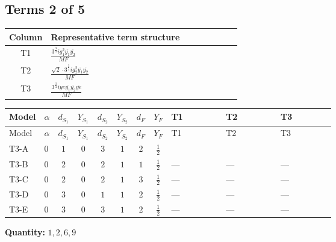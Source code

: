 \documentclass[8pt]{article}
\begin{document}
\begin{landscape}
\subsection*{Terms 2 of 5}
\begin{center}
\begin{tabular}{@{}c >{\raggedright\arraybackslash}p{0.82\linewidth}@{}}
\toprule
Column & Representative term structure \\
\midrule
T1 & \(\displaystyle \frac{3^{\frac{3}{4}} i g_{1}^{2} \overline{y_{1}} \overline{y_{2}}}{MF}\) \\
\midrule
T2 & \(\displaystyle \frac{\sqrt{2} \cdot 3^{\frac{3}{4}} i g_{2}^{2} \overline{y_{1}} \overline{y_{2}}}{MF}\) \\
\midrule
T3 & \(\displaystyle \frac{3^{\frac{3}{4}} i ye \overline{y_{1}} \overline{y_{2}} \overline{ye}}{MF}\) \\
\midrule
\bottomrule
\end{tabular}
\end{center}
\smallskip
\tiny
\begin{longtable}{@{}llcccccc >{\raggedright\arraybackslash}p{0.21\linewidth} >{\raggedright\arraybackslash}p{0.21\linewidth} >{\raggedright\arraybackslash}p{0.21\linewidth}@{}}
\toprule
Model & $\alpha$ & $d_{S_1}$ & $Y_{S_1}$ & $d_{S_2}$ & $Y_{S_2}$ & $d_F$ & $Y_F$ & T1 & T2 & T3 \\
\midrule
\endfirsthead
\toprule
Model & $\alpha$ & $d_{S_1}$ & $Y_{S_1}$ & $d_{S_2}$ & $Y_{S_2}$ & $d_F$ & $Y_F$ & T1 & T2 & T3 \\
\midrule
\endhead
T3-A & $0$ & $1$ & $0$ & $3$ & $1$ & $2$ & $\frac{1}{2}$ & \scriptsize\adjustbox{max width=\linewidth}{$\begin{gathered} - \frac{3^{\frac{3}{4}} i g_{1}^{2} \overline{y_{1}} \overline{y_{2}}}{8 MF}\end{gathered}$} & \scriptsize\adjustbox{max width=\linewidth}{$\begin{gathered} - \frac{\sqrt{2} \cdot 3^{\frac{3}{4}} i g_{2}^{2} \overline{y_{1}} \overline{y_{2}}}{6 MF}\end{gathered}$} & \scriptsize\adjustbox{max width=\linewidth}{$\begin{gathered} \frac{3^{\frac{3}{4}} i ye \overline{y_{1}} \overline{y_{2}} \overline{ye}}{12 MF}\end{gathered}$} \\
\midrule
T3-B & $0$ & $2$ & $0$ & $2$ & $1$ & $1$ & $\frac{1}{2}$ & --- & --- & --- \\
\midrule
T3-C & $0$ & $2$ & $0$ & $2$ & $1$ & $3$ & $\frac{1}{2}$ & --- & --- & --- \\
\midrule
T3-D & $0$ & $3$ & $0$ & $1$ & $1$ & $2$ & $\frac{1}{2}$ & --- & --- & --- \\
\midrule
T3-E & $0$ & $3$ & $0$ & $3$ & $1$ & $2$ & $\frac{1}{2}$ & --- & --- & --- \\
\midrule
\bottomrule
\end{longtable}
\clearpage
\noindent\textbf{Quantity: }$\mathrm{1,2,6,9}$\par\smallskip

\end{landscape}
\end{document}
